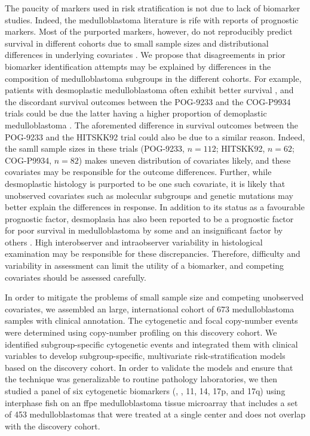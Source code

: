 The paucity of markers used in risk stratification is not due to lack of biomarker studies. Indeed, the medulloblastoma literature is rife with reports of prognostic markers. Most of the purported markers, however, do not reproducibly predict survival in different cohorts due to small sample sizes and distributional differences in underlying covariates . We propose that disagreements in prior biomarker identification attempts may be explained by differences in the composition of medulloblastoma subgroups in the different cohorts. For example, patients with desmoplastic medulloblastoma often exhibit better survival , and the discordant survival outcomes between the POG-9233 and the COG-P9934 trials could be due the latter having a higher proportion of demoplastic medulloblastoma . The aforemented difference in survival outcomes between the POG-9233 and the HITSKK92 trial could also be due to a similar reason. Indeed, the samll sample sizes in these trials (POG-9233, $n = 112$; HITSKK92, $n = 62 $; COG-P9934, $n = 82$) makes uneven distribution of covariates likely, and these covariates may be responsible for the outcome differences. Further, while desmoplastic histology is purported to be one such covariate, it is likely that unobserved covariates such as molecular subgroups and genetic mutations may better explain the differences in response. In addition to its status as a favourable prognostic factor, desmoplasia has also been reported to be a prognostic factor for poor survival in medulloblastoma by some  and an insignificant factor by others . High interobserver and intraobserver variability in histological examination may be responsible for these discrepancies. Therefore, difficulty and variability in assessment can limit the utility of a biomarker, and competing covariates should be assessed carefully.

In order to mitigate the problems of small sample size and competing unobserved covariates, we assembled an large, international cohort of 673 medulloblastoma samples with clinical annotation. The cytogenetic and focal copy-number events were determined using copy-number profiling on this discovery cohort. We identified subgroup-specific cytogenetic events and integrated them with clinical variables to develop subgroup-specific, multivariate risk-stratification models based on the discovery cohort. In order to validate the models and ensure that the technique was generalizable to routine pathology laboratories, we then studied a panel of six cytogenetic biomarkers (, , 11, 14, 17p, and 17q) using interphase \gls{fish} on an \gls{ffpe} medulloblastoma tissue microarray that includes a set of 453 medulloblastomas that were treated at a single center and does not overlap with the discovery cohort.

